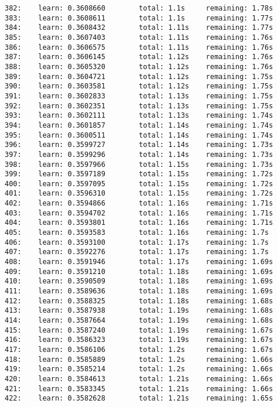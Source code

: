 \documentclass[11pt]{article}
\begin{document}
\begin{Verbatim}[commandchars=\\\{\}]
382:    learn: 0.3608660        total: 1.1s     remaining: 1.78s
383:    learn: 0.3608611        total: 1.1s     remaining: 1.77s
384:    learn: 0.3608432        total: 1.11s    remaining: 1.77s
385:    learn: 0.3607403        total: 1.11s    remaining: 1.76s
386:    learn: 0.3606575        total: 1.11s    remaining: 1.76s
387:    learn: 0.3606145        total: 1.12s    remaining: 1.76s
388:    learn: 0.3605320        total: 1.12s    remaining: 1.76s
389:    learn: 0.3604721        total: 1.12s    remaining: 1.75s
390:    learn: 0.3603581        total: 1.12s    remaining: 1.75s
391:    learn: 0.3602833        total: 1.13s    remaining: 1.75s
392:    learn: 0.3602351        total: 1.13s    remaining: 1.75s
393:    learn: 0.3602111        total: 1.13s    remaining: 1.74s
394:    learn: 0.3601857        total: 1.14s    remaining: 1.74s
395:    learn: 0.3600511        total: 1.14s    remaining: 1.74s
396:    learn: 0.3599727        total: 1.14s    remaining: 1.73s
397:    learn: 0.3599296        total: 1.14s    remaining: 1.73s
398:    learn: 0.3597966        total: 1.15s    remaining: 1.73s
399:    learn: 0.3597189        total: 1.15s    remaining: 1.72s
400:    learn: 0.3597095        total: 1.15s    remaining: 1.72s
401:    learn: 0.3596310        total: 1.15s    remaining: 1.72s
402:    learn: 0.3594866        total: 1.16s    remaining: 1.71s
403:    learn: 0.3594702        total: 1.16s    remaining: 1.71s
404:    learn: 0.3593801        total: 1.16s    remaining: 1.71s
405:    learn: 0.3593583        total: 1.16s    remaining: 1.7s
406:    learn: 0.3593100        total: 1.17s    remaining: 1.7s
407:    learn: 0.3592276        total: 1.17s    remaining: 1.7s
408:    learn: 0.3591946        total: 1.17s    remaining: 1.69s
409:    learn: 0.3591210        total: 1.18s    remaining: 1.69s
410:    learn: 0.3590509        total: 1.18s    remaining: 1.69s
411:    learn: 0.3589636        total: 1.18s    remaining: 1.69s
412:    learn: 0.3588325        total: 1.18s    remaining: 1.68s
413:    learn: 0.3587938        total: 1.19s    remaining: 1.68s
414:    learn: 0.3587664        total: 1.19s    remaining: 1.68s
415:    learn: 0.3587240        total: 1.19s    remaining: 1.67s
416:    learn: 0.3586323        total: 1.19s    remaining: 1.67s
417:    learn: 0.3586106        total: 1.2s     remaining: 1.67s
418:    learn: 0.3585889        total: 1.2s     remaining: 1.66s
419:    learn: 0.3585214        total: 1.2s     remaining: 1.66s
420:    learn: 0.3584613        total: 1.21s    remaining: 1.66s
421:    learn: 0.3583345        total: 1.21s    remaining: 1.66s
422:    learn: 0.3582628        total: 1.21s    remaining: 1.65s

\end{Verbatim}
\end{document}
